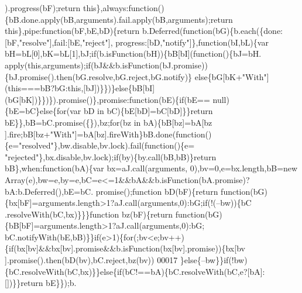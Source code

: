 \begin{DoxyCode}
      ).progress(bF);\textcolor{keywordflow}{return} \textcolor{keyword}{this}\},always:\textcolor{keyword}{function}()\{bB.done.apply(bB,arguments).fail.apply(bB,arguments);\textcolor{keywordflow}{return} \textcolor{keyword}{
      this}\},pipe:\textcolor{keyword}{function}(bF,bE,bD)\{\textcolor{keywordflow}{return} b.Deferred(\textcolor{keyword}{function}(bG)\{b.each(\{done:[bF,\textcolor{stringliteral}{"resolve"}],fail:[bE,\textcolor{stringliteral}{"reject"}],
      progress:[bD,\textcolor{stringliteral}{"notify"}]\},\textcolor{keyword}{function}(bI,bL)\{var bH=bL[0],bK=bL[1],bJ;\textcolor{keywordflow}{if}(b.isFunction(bH))\{bB[bI](\textcolor{keyword}{function}()\{bJ=bH.
      apply(\textcolor{keyword}{this},arguments);\textcolor{keywordflow}{if}(bJ&&b.isFunction(bJ.promise))\{bJ.promise().then(bG.resolve,bG.reject,bG.notify)\}\textcolor{keywordflow}{
      else}\{bG[bK+\textcolor{stringliteral}{"With"}](\textcolor{keyword}{this}===bB?bG:\textcolor{keyword}{this},[bJ])\}\})\}\textcolor{keywordflow}{else}\{bB[bI](bG[bK])\}\})\}).promise()\},promise:\textcolor{keyword}{function}(bE)\{\textcolor{keywordflow}{if}(bE==
      null)\{bE=bC\}\textcolor{keywordflow}{else}\{\textcolor{keywordflow}{for}(var bD in bC)\{bE[bD]=bC[bD]\}\}\textcolor{keywordflow}{return} bE\}\},bB=bC.promise(\{\}),bz;\textcolor{keywordflow}{for}(bz in bA)\{bB[bz]=bA[bz
      ].fire;bB[bz+\textcolor{stringliteral}{"With"}]=bA[bz].fireWith\}bB.done(\textcolor{keyword}{function}()\{e=\textcolor{stringliteral}{"resolved"}\},bw.disable,bv.lock).fail(\textcolor{keyword}{function}()\{e=\textcolor{stringliteral}{
      "rejected"}\},bx.disable,bv.lock);\textcolor{keywordflow}{if}(by)\{by.call(bB,bB)\}\textcolor{keywordflow}{return} bB\},when:\textcolor{keyword}{function}(bA)\{var bx=aJ.call(arguments,
      0),bv=0,e=bx.length,bB=\textcolor{keyword}{new} Array(e),bw=e,by=e,bC=e<=1&&bA&&b.isFunction(bA.promise)?bA:b.Deferred(),bE=bC.
      promise();\textcolor{keyword}{function} bD(bF)\{\textcolor{keywordflow}{return} \textcolor{keyword}{function}(bG)\{bx[bF]=arguments.length>1?aJ.call(arguments,0):bG;\textcolor{keywordflow}{if}(!(--bw))\{bC
      .resolveWith(bC,bx)\}\}\}\textcolor{keyword}{function} bz(bF)\{\textcolor{keywordflow}{return} \textcolor{keyword}{function}(bG)\{bB[bF]=arguments.length>1?aJ.call(arguments,0):bG;
      bC.notifyWith(bE,bB)\}\}\textcolor{keywordflow}{if}(e>1)\{\textcolor{keywordflow}{for}(;bv<e;bv++)\{\textcolor{keywordflow}{if}(bx[bv]&&bx[bv].promise&&b.isFunction(bx[bv].promise))\{bx[bv
      ].promise().then(bD(bv),bC.reject,bz(bv))
00017 \}\textcolor{keywordflow}{else}\{--bw\}\}\textcolor{keywordflow}{if}(!bw)\{bC.resolveWith(bC,bx)\}\}\textcolor{keywordflow}{else}\{\textcolor{keywordflow}{if}(bC!==bA)\{bC.resolveWith(bC,e?[bA]:[])\}\}\textcolor{keywordflow}{return} bE\}\});b.

\end{DoxyCode}
